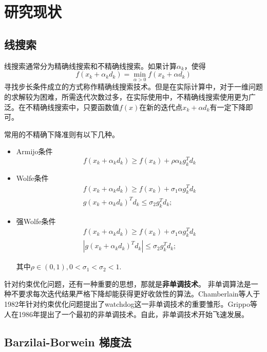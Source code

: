 
\chapter{\hei 研究现状}

\section{\hei 线搜索}
线搜索通常分为精确线搜索和不精确线搜索。如果计算$ \alpha_{k} $，使得
\begin{equation}
	f(x_{k}+\alpha_{k} d_{k})=\min_{\alpha >0} f(x_{k}+\alpha d_{k})
\end{equation}
寻找步长条件成立的方式称作精确线搜索技术。但是在实际计算中，对于一维问题的求解较为困难，所需迭代次数过多，在实际使用中，不精确线搜索使用更为广泛。在不精确线搜索中，只要函数值$ f(x) $在新的迭代点$ x_{k}+\alpha d_{k} $有一定下降即可。

常用的不精确下降准则有以下几种。
\begin{itemize}
	\item Armijo条件
	$$ 	f(x_{k}+\alpha_{k} d_{k}) \geq 	f(x_{k})+\rho \alpha_{k} g_{k}^{T} d_{k}$$
	\item Wolfe条件
	\begin{eqnarray*}
		f(x_{k}+\alpha_{k} d_{k}) \geq 	f(x_{k})+ \sigma_{1}\alpha g_{k}^{T} d_{k}\\
		g(x_{k}+\alpha_{k}d_{k})^{T}d_{k} \leq \sigma_{2} g_{k}^{T} d_{k};
	\end{eqnarray*}
	\item 强Wolfe条件
	\begin{eqnarray*}
		f(x_{k}+\alpha_{k} d_{k}) \geq 	f(x_{k})+ \sigma_{1}\alpha g_{k}^{T} d_{k}\\
		| g(x_{k}+\alpha_{k}d_{k})^{T}d_{k}| \leq \sigma_{2} g_{k}^{T} d_{k};
	\end{eqnarray*}
	
	其中$ \rho \in (0,1),0<\sigma_{1}<\sigma_{2}<1 $.
	
\end{itemize}

针对约束优化问题，还有一种重要的思想，那就是\textbf{非单调技术}。 非单调算法是一种不要求每次迭代结果严格下降却能获得更好收敛性的算法。Chamberlain等人\cite{chamberlain1982watchdog}于1982年针对约束优化问题提出了watchdog这一非单调技术的重要雏形。Grippo等人\cite{grippo1986nonmonotone}在1986年提出了一个最初的非单调技术。自此，非单调技术开始飞速发展。

\section{\hei Barzilai-Borwein 梯度法}

